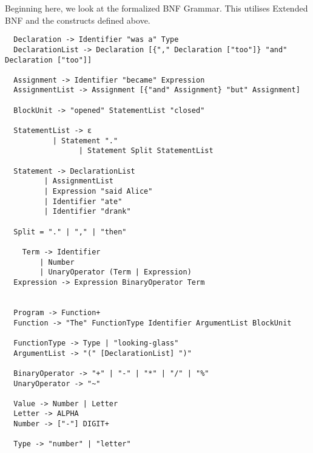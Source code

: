 \documentclass[a4wide, 11pt]{article}
\begin{document}
Beginning here, we look at the formalized BNF Grammar. This utilises Extended BNF and the constructs defined above.

\begin{verbatim}
  Declaration -> Identifier "was a" Type
  DeclarationList -> Declaration [{"," Declaration ["too"]} "and" Declaration ["too"]]

  Assignment -> Identifier "became" Expression
  AssignmentList -> Assignment [{"and" Assignment} "but" Assignment]

  BlockUnit -> "opened" StatementList "closed"

  StatementList -> ε
           | Statement "."
                 | Statement Split StatementList
                 
  Statement -> DeclarationList
         | AssignmentList
         | Expression "said Alice"
         | Identifier "ate"
         | Identifier "drank"

  Split = "." | "," | "then"
 
    Term -> Identifier
        | Number
        | UnaryOperator (Term | Expression)
  Expression -> Expression BinaryOperator Term


  Program -> Function+
  Function -> "The" FunctionType Identifier ArgumentList BlockUnit

  FunctionType -> Type | "looking-glass"
  ArgumentList -> "(" [DeclarationList] ")"

  BinaryOperator -> "+" | "-" | "*" | "/" | "%"
  UnaryOperator -> "~" 

  Value -> Number | Letter
  Letter -> ALPHA
  Number -> ["-"] DIGIT+
  
  Type -> "number" | "letter"

\end{verbatim}





    
    
\end{document}
